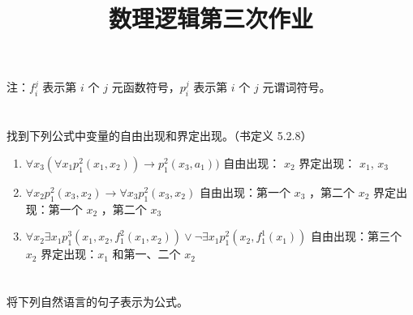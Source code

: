 \documentclass[UTF8]{ctexart}
\date{}
\title{\vspace{-4em} 数理逻辑第三次作业}
\begin{document}
    \maketitle
    
    注：$f_{i}^{j}$ 表示第 $i$ 个 $j$ 元函数符号，$p_{i}^{j}$ 表示第 $i$ 个 $j$ 元谓词符号。

    \section{}

    找到下列公式中变量的自由出现和界定出现。（书定义 5.2.8）

    \begin{enumerate}
        \item $\forall x_3(\forall x_1 p_1^2(x_1, x_2)) \to p_1^{2}(x_3, a_1))$ \newline
        自由出现： $x_2$   \newline
        界定出现： $x_1$, $x_3$
        \item $\forall x_2 p_1^2(x_3, x_2) \to \forall x_3 p_1^{2} (x_3, x_2)$  \newline
        自由出现：第一个 $x_3$ ，第二个 $x_2$  \newline
        界定出现：第一个 $x_2$ ，第二个 $x_3$
        \item $\forall x_2 \exists x_1 p_1^3(x_1, x_2, f_1^2(x_1, x_2)) \lor \lnot \exists x_1 p_1^2(x_2, f_1^{1}(x_1))$    \newline
        自由出现：第三个 $x_2$ \newline
        界定出现：$x_1$ 和第一、二个 $x_2$
    \end{enumerate}

    \section{}

    将下列自然语言的句子表示为公式。
\end{document}
